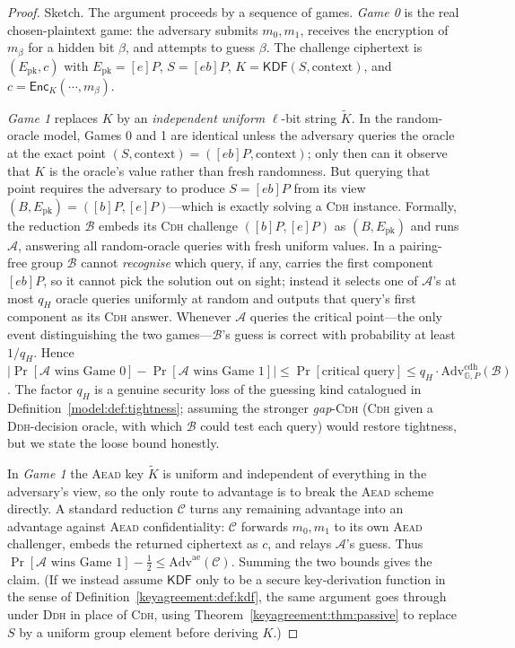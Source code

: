 \documentclass[11pt,a4paper]{article}
\theoremstyle{definition}
\theoremstyle{remark}
\newcommand{\G}{\ensuremath{\mathbb{G}}}
\begin{document}
\begin{proof}
Sketch. The argument proceeds by a sequence of games. \emph{Game 0} is the real chosen-plaintext game: the adversary submits \(m_0, m_1\), receives the encryption of \(m_\beta\) for a hidden bit \(\beta\), and attempts to guess \(\beta\). The challenge ciphertext is \((E_{\mathrm{pk}}, c)\) with \(E_{\mathrm{pk}} = [e]P\), \(S = [eb]P\), \(K = \mathsf{KDF}(S, \mathrm{context})\), and \(c = \mathsf{Enc}_K(\cdots, m_\beta)\).

\emph{Game 1} replaces \(K\) by an \emph{independent uniform} \(\ell\)-bit string \(\widetilde K\). In the random-oracle model, Games 0 and 1 are identical unless the adversary queries the oracle at the exact point \((S, \mathrm{context}) = ([eb]P, \mathrm{context})\); only then can it observe that \(K\) is the oracle's value rather than fresh randomness. But querying that point requires the adversary to produce \(S = [eb]P\) from its view \((B, E_{\mathrm{pk}}) = ([b]P, [e]P)\)---which is exactly solving a \textsc{Cdh} instance. Formally, the reduction \(\mathcal{B}\) embeds its \textsc{Cdh} challenge \(([b]P, [e]P)\) as \((B, E_{\mathrm{pk}})\) and runs \(\mathcal{A}\), answering all random-oracle queries with fresh uniform values. In a pairing-free group \(\mathcal{B}\) cannot \emph{recognise} which query, if any, carries the first component \([eb]P\), so it cannot pick the solution out on sight; instead it selects one of \(\mathcal{A}\)'s at most \(q_H\) oracle queries uniformly at random and outputs that query's first component as its \textsc{Cdh} answer. Whenever \(\mathcal{A}\) queries the critical point---the only event distinguishing the two games---\(\mathcal{B}\)'s guess is correct with probability at least \(1/q_H\). Hence \(|\Pr[\mathcal{A}\text{ wins Game }0] - \Pr[\mathcal{A}\text{ wins Game }1]| \le \Pr[\text{critical query}] \le q_H \cdot \mathrm{Adv}^{\mathrm{cdh}}_{\G,P}(\mathcal{B})\). The factor \(q_H\) is a genuine security loss of the guessing kind catalogued in Definition~\ref{model:def:tightness}; assuming the stronger \emph{gap}-\textsc{Cdh} (\textsc{Cdh} given a \textsc{Ddh}-decision oracle, with which \(\mathcal{B}\) could test each query) would restore tightness, but we state the loose bound honestly.

In \emph{Game 1} the \textsc{Aead} key \(\widetilde K\) is uniform and independent of everything in the adversary's view, so the only route to advantage is to break the \textsc{Aead} scheme directly. A standard reduction \(\mathcal{C}\) turns any remaining advantage into an advantage against \textsc{Aead} confidentiality: \(\mathcal{C}\) forwards \(m_0, m_1\) to its own \textsc{Aead} challenger, embeds the returned ciphertext as \(c\), and relays \(\mathcal{A}\)'s guess. Thus \(\Pr[\mathcal{A}\text{ wins Game }1] - \tfrac12 \le \mathrm{Adv}^{\mathrm{ae}}(\mathcal{C})\). Summing the two bounds gives the claim. (If we instead assume \(\mathsf{KDF}\) only to be a secure key-derivation function in the sense of Definition~\ref{keyagreement:def:kdf}, the same argument goes through under \textsc{Ddh} in place of \textsc{Cdh}, using Theorem~\ref{keyagreement:thm:passive} to replace \(S\) by a uniform group element before deriving \(K\).)
\end{proof}
\end{document}

